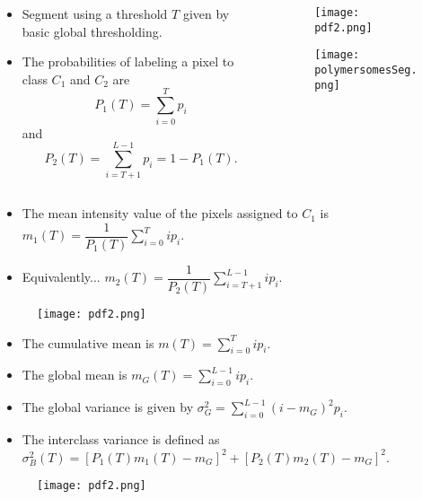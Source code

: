 \begin{frame}
\begin{columns}
\begin{column}{.6\textwidth}
\begin{itemize}
\item Segment using a threshold $T$ given by basic global thresholding.
\item The probabilities of labeling a pixel to class $C_{1}$ and $C_{2}$ are
\[
P_{1}(T)=\sum_{i=0}^{T}p_{i}%
\]
and
\[
P_{2}(T)=\sum_{i=T+1}^{L-1}p_{i} = 1-P_{1}(T).
\]
\end{itemize}
\end{column}
\begin{column}{.4\textwidth}
\begin{figure}[!h]
\texttt{[image: pdf2.png]}
\end{figure}
\begin{figure}[!h]
\texttt{[image: polymersomesSeg.png]}
\end{figure}
\end{column}
\end{columns}
\end{frame}

\begin{frame}
\begin{itemize}
\item The mean intensity value of the pixels assigned to $C_{1}$ is
$m_{1}(T) = \dfrac{1}{P_{1}(T)} \sum_{i=0}^{T} i p_{i}$.
\item Equivalently...
$m_{2}(T) = \dfrac{1}{P_{2}(T)} \sum_{i=T+1}^{L-1} i p_{i}$.
\end{itemize}
\begin{figure}[!h]
\texttt{[image: pdf2.png]}
\end{figure}
\end{frame}

\begin{frame}
\begin{itemize}
\item The cumulative mean is $m(T) = \sum_{i=0}^{T} ip_{i}$.
\item The global mean is $m_{G}(T) = \sum_{i=0}^{L-1}ip_{i}$.
\item The global variance is  given by
$\sigma_{G}^{2} = \sum_{i=0}^{L-1} (i-m_{G})^{2} p_{i}$.
\item The interclass variance is defined as
$\sigma_{B}^{2}(T) = \left [ P_{1}(T) m_{1}(T) - m_{G} \right ]^{2} + \left [ P_{2}(T) m_{2}(T) - m_{G}\right ]^{2}$.
\end{itemize}
\begin{figure}[!h]
\texttt{[image: pdf2.png]}
\end{figure}
\end{frame}

